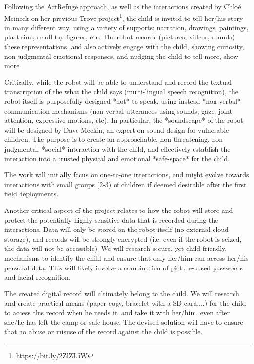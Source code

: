 \documentclass[11pt]{report}
\begin{document}
Following the ArtRefuge approach, as well as the interactions created by Chloé
Meineck on her previous Trove project\footnote{\url{https://bit.ly/2ZlZL5W}},
the child is invited to tell her/his story in many different way, using a
variety of supports: narration, drawings, paintings, plasticine, small toy
figures, etc.  The robot records (pictures, videos, sounds) these
representations, and also actively engage with the child, showing curiosity,
non-judgmental emotional responses, and nudging the child to tell more, show
more.

Critically, while the robot will be able to understand and record the textual
transcription of the what the child says (multi-lingual speech recognition),
the robot itself is purposefully designed *not* to speak, using instead *non-verbal*
communication mechanisms (non-verbal utterances using sounds, gaze, joint
attention, expressive motions, etc). In particular, the *soundscape* of the
robot will be designed by Dave Meckin, an expert on sound design for vulnerable
children. The purpose is to create an approachable, non-threatening,
non-judgmental, *social* interaction with the child, and effectively establish
the interaction into a trusted physical and emotional *safe-space* for the
child.

The work will initially focus on one-to-one interactions, and might evolve
towards interactions with small groups (2-3) of children if deemed desirable
after the first field deployments.

Another critical aspect of the project relates to how the robot will store and
protect the potentially highly sensitive data that is recorded during the
interactions. Data will only be stored on the robot itself (no external cloud
storage), and records will be strongly encrypted (i.e. even if the robot is
seized, the data will not be accessible). We will research secure, yet
child-friendly, mechanisms to identify the child and ensure that only her/him
can access her/his personal data. This will likely involve a combination of
picture-based passwords and facial recognition.

The created digital record will ultimately belong to the child. We will research
and create practical means (paper copy, bracelet with a SD card,...) for the
child to access this record when he needs it, and take it with her/him, even
after she/he has left the camp or safe-house. The devised solution will have to
ensure that no abuse or misuse of the record against the child is possible.

\end{document}
